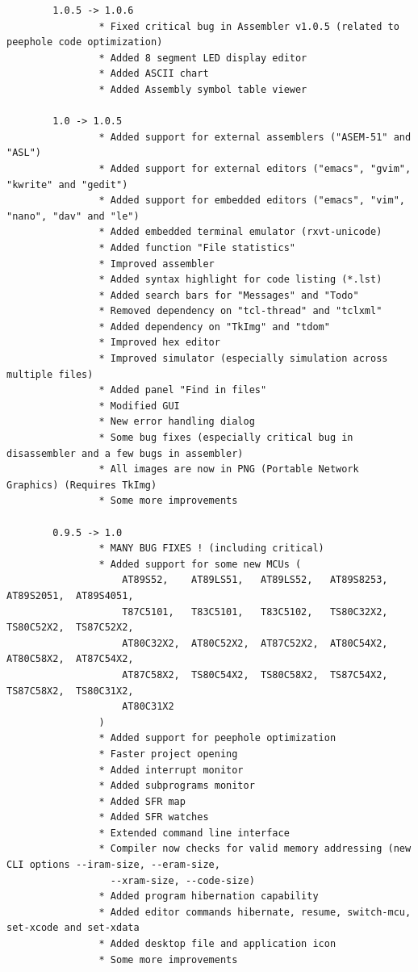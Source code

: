\documentclass[a4paper,twoside,12pt]{book}
\begin{document}
{\begin{verbatim}
		1.0.5 -> 1.0.6
		        * Fixed critical bug in Assembler v1.0.5 (related to peephole code optimization)
		        * Added 8 segment LED display editor
		        * Added ASCII chart
		        * Added Assembly symbol table viewer

		1.0 -> 1.0.5
		        * Added support for external assemblers ("ASEM-51" and  "ASL")
		        * Added support for external editors ("emacs", "gvim", "kwrite" and "gedit")
		        * Added support for embedded editors ("emacs", "vim", "nano", "dav" and "le")
		        * Added embedded terminal emulator (rxvt-unicode)
		        * Added function "File statistics"
		        * Improved assembler
		        * Added syntax highlight for code listing (*.lst)
		        * Added search bars for "Messages" and "Todo"
		        * Removed dependency on "tcl-thread" and "tclxml"
		        * Added dependency on "TkImg" and "tdom"
		        * Improved hex editor
		        * Improved simulator (especially simulation across multiple files)
		        * Added panel "Find in files"
		        * Modified GUI
		        * New error handling dialog
		        * Some bug fixes (especially critical bug in disassembler and a few bugs in assembler)
		        * All images are now in PNG (Portable Network Graphics) (Requires TkImg)
		        * Some more improvements

		0.9.5 -> 1.0
		        * MANY BUG FIXES ! (including critical)
		        * Added support for some new MCUs (
		            AT89S52,	AT89LS51,	AT89LS52,	AT89S8253,	AT89S2051,	AT89S4051,
		            T87C5101,	T83C5101,	T83C5102,	TS80C32X2,	TS80C52X2,	TS87C52X2,
		            AT80C32X2,	AT80C52X2,	AT87C52X2,	AT80C54X2,	AT80C58X2,	AT87C54X2,
		            AT87C58X2,	TS80C54X2,	TS80C58X2,	TS87C54X2,	TS87C58X2,	TS80C31X2,
		            AT80C31X2
		        )
		        * Added support for peephole optimization
		        * Faster project opening
		        * Added interrupt monitor
		        * Added subprograms monitor
		        * Added SFR map
		        * Added SFR watches
		        * Extended command line interface
		        * Compiler now checks for valid memory addressing (new CLI options --iram-size, --eram-size,
		          --xram-size, --code-size)
		        * Added program hibernation capability
		        * Added editor commands hibernate, resume, switch-mcu, set-xcode and set-xdata
		        * Added desktop file and application icon
		        * Some more improvements


\end{verbatim}}
\end{document}
